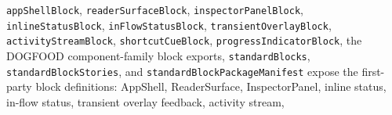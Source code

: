 \begin{itemize}
  \texttt{a\allowbreak{}p\allowbreak{}p\allowbreak{}S\allowbreak{}h\allowbreak{}e\allowbreak{}l\allowbreak{}l\allowbreak{}B\allowbreak{}l\allowbreak{}o\allowbreak{}c\allowbreak{}k}, \texttt{r\allowbreak{}e\allowbreak{}a\allowbreak{}d\allowbreak{}e\allowbreak{}r\allowbreak{}S\allowbreak{}u\allowbreak{}r\allowbreak{}f\allowbreak{}a\allowbreak{}c\allowbreak{}e\allowbreak{}B\allowbreak{}l\allowbreak{}o\allowbreak{}c\allowbreak{}k}, \texttt{i\allowbreak{}n\allowbreak{}s\allowbreak{}p\allowbreak{}e\allowbreak{}c\allowbreak{}t\allowbreak{}o\allowbreak{}r\allowbreak{}P\allowbreak{}a\allowbreak{}n\allowbreak{}e\allowbreak{}l\allowbreak{}B\allowbreak{}l\allowbreak{}o\allowbreak{}c\allowbreak{}k}, \texttt{i\allowbreak{}n\allowbreak{}l\allowbreak{}i\allowbreak{}n\allowbreak{}e\allowbreak{}S\allowbreak{}t\allowbreak{}a\allowbreak{}t\allowbreak{}u\allowbreak{}s\allowbreak{}B\allowbreak{}l\allowbreak{}o\allowbreak{}c\allowbreak{}k}, \texttt{i\allowbreak{}n\allowbreak{}F\allowbreak{}l\allowbreak{}o\allowbreak{}w\allowbreak{}S\allowbreak{}t\allowbreak{}a\allowbreak{}t\allowbreak{}u\allowbreak{}s\allowbreak{}B\allowbreak{}l\allowbreak{}o\allowbreak{}c\allowbreak{}k}, \texttt{t\allowbreak{}r\allowbreak{}a\allowbreak{}n\allowbreak{}s\allowbreak{}i\allowbreak{}e\allowbreak{}n\allowbreak{}t\allowbreak{}O\allowbreak{}v\allowbreak{}e\allowbreak{}r\allowbreak{}l\allowbreak{}a\allowbreak{}y\allowbreak{}B\allowbreak{}l\allowbreak{}o\allowbreak{}c\allowbreak{}k}, \texttt{a\allowbreak{}c\allowbreak{}t\allowbreak{}i\allowbreak{}v\allowbreak{}i\allowbreak{}t\allowbreak{}y\allowbreak{}S\allowbreak{}t\allowbreak{}r\allowbreak{}e\allowbreak{}a\allowbreak{}m\allowbreak{}B\allowbreak{}l\allowbreak{}o\allowbreak{}c\allowbreak{}k}, \texttt{s\allowbreak{}h\allowbreak{}o\allowbreak{}r\allowbreak{}t\allowbreak{}c\allowbreak{}u\allowbreak{}t\allowbreak{}C\allowbreak{}u\allowbreak{}e\allowbreak{}B\allowbreak{}l\allowbreak{}o\allowbreak{}c\allowbreak{}k}, \texttt{p\allowbreak{}r\allowbreak{}o\allowbreak{}g\allowbreak{}r\allowbreak{}e\allowbreak{}s\allowbreak{}s\allowbreak{}I\allowbreak{}n\allowbreak{}d\allowbreak{}i\allowbreak{}c\allowbreak{}a\allowbreak{}t\allowbreak{}o\allowbreak{}r\allowbreak{}B\allowbreak{}l\allowbreak{}o\allowbreak{}c\allowbreak{}k}, the DOGFOOD component-family block exports, \texttt{s\allowbreak{}t\allowbreak{}a\allowbreak{}n\allowbreak{}d\allowbreak{}a\allowbreak{}r\allowbreak{}d\allowbreak{}B\allowbreak{}l\allowbreak{}o\allowbreak{}c\allowbreak{}k\allowbreak{}s}, \texttt{s\allowbreak{}t\allowbreak{}a\allowbreak{}n\allowbreak{}d\allowbreak{}a\allowbreak{}r\allowbreak{}d\allowbreak{}B\allowbreak{}l\allowbreak{}o\allowbreak{}c\allowbreak{}k\allowbreak{}S\allowbreak{}t\allowbreak{}o\allowbreak{}r\allowbreak{}i\allowbreak{}e\allowbreak{}s}, and \texttt{s\allowbreak{}t\allowbreak{}a\allowbreak{}n\allowbreak{}d\allowbreak{}a\allowbreak{}r\allowbreak{}d\allowbreak{}B\allowbreak{}l\allowbreak{}o\allowbreak{}c\allowbreak{}k\allowbreak{}P\allowbreak{}a\allowbreak{}c\allowbreak{}k\allowbreak{}a\allowbreak{}g\allowbreak{}e\allowbreak{}M\allowbreak{}a\allowbreak{}n\allowbreak{}i\allowbreak{}f\allowbreak{}e\allowbreak{}s\allowbreak{}t} expose the first-party block definitions: AppShell, ReaderSurface, InspectorPanel, inline status, in-flow status, transient overlay feedback, activity stream, 
\end{itemize}
